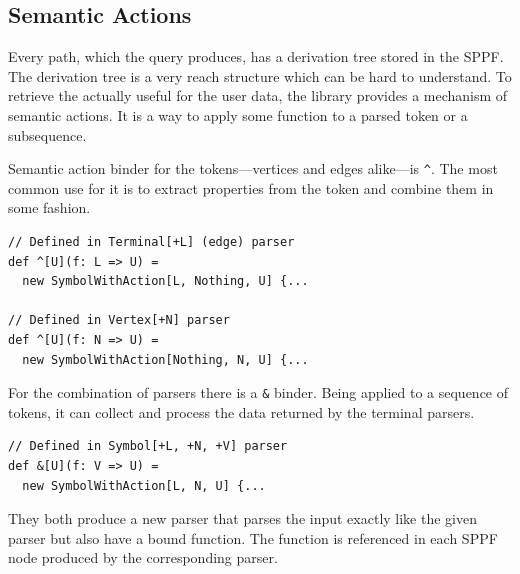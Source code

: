 \subsection{Semantic Actions}
\label{sec:semanticActions}

Every path, which the query produces, has a derivation tree stored in the SPPF. 
The derivation tree is a very reach structure which can be hard to understand. 
To retrieve the actually useful for the user data, the library provides a mechanism of semantic actions. 
It is a way to apply some function to a parsed token or a subsequence. 


Semantic action binder for the tokens---vertices and edges alike---is \lstinline{^}. The most common use for it is to extract properties from the token and combine them in some fashion. 

\begin{lstlisting}
// Defined in Terminal[+L] (edge) parser
def ^[U](f: L => U) = 
  new SymbolWithAction[L, Nothing, U] {...
  
// Defined in Vertex[+N] parser
def ^[U](f: N => U) = 
  new SymbolWithAction[Nothing, N, U] {...
\end{lstlisting}

For the combination of parsers there is a \lstinline{&} binder. Being  applied to a sequence of tokens, it can collect and process the data returned by the terminal parsers.
\begin{lstlisting}
// Defined in Symbol[+L, +N, +V] parser
def &[U](f: V => U) = 
  new SymbolWithAction[L, N, U] {...
\end{lstlisting}

They both produce a new parser that parses the input exactly like the given parser but also have a bound function.
The function is referenced in each SPPF node produced by the corresponding parser.

